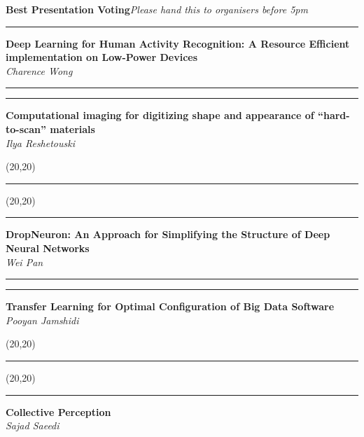 \documentclass[11pt]{article}
\newcommand{\talk}[1]{\Large\flushleft\textbf{#1}\\}
\newcommand{\speaker}[1]{\textit{#1}\\}
\newcommand{\separator}{\noindent\rule{\linewidth}{0.1mm}}
\newcommand{\votebox}{\vspace{-5cm}\noindent\hfill\framebox(20,20){}}
\newcommand{\hstrut}{\noindent\color{iclightblue}\rule{\linewidth}{0pt}}
\begin{document}
\clearpage
\noindent
\textbf{\flushleft\LARGE\color{icdarkblue}Best Presentation Voting}\hfill\textit{Please hand this to organisers before 5pm}\\
\noindent
\begin{minipage}[t]{0.49\linewidth}
\separator%
\talk{Deep Learning for Human Activity Recognition: A Resource Efficient
      implementation on Low-Power Devices}
\speaker{Charence Wong}
\end{minipage}
\begin{minipage}[t]{0.02\linewidth}
\hstrut%
\end{minipage}
\begin{minipage}[t]{0.49\linewidth}
\separator%
\talk{Computational imaging for digitizing shape and appearance of
      ``hard-to-scan'' materials}
\speaker{Ilya Reshetouski}
\end{minipage}
\vfill
\noindent
\begin{minipage}[b]{0.49\linewidth}
\votebox%
\end{minipage}
\begin{minipage}[b]{0.02\linewidth}
\hstrut%
\end{minipage}
\begin{minipage}[b]{0.49\linewidth}
\votebox%
\end{minipage}
\noindent
\begin{minipage}[t]{0.49\linewidth}
\separator%
\talk{DropNeuron: An Approach for Simplifying the Structure of Deep Neural
      Networks}
\speaker{Wei Pan}
\end{minipage}
\begin{minipage}[t]{0.02\linewidth}
\hstrut%
\end{minipage}
\begin{minipage}[t]{0.49\linewidth}
\separator%
\talk{Transfer Learning for Optimal Configuration of Big Data Software}
\speaker{Pooyan Jamshidi}
\end{minipage}
\vfill
\noindent
\begin{minipage}[b]{0.49\linewidth}
\votebox%
\end{minipage}
\begin{minipage}[b]{0.02\linewidth}
\hstrut%
\end{minipage}
\begin{minipage}[b]{0.49\linewidth}
\votebox%
\end{minipage}
\noindent
\begin{minipage}[t]{0.49\linewidth}
\separator%
\talk{Collective Perception}
\speaker{Sajad Saeedi}
\end{minipage}
\end{document}
